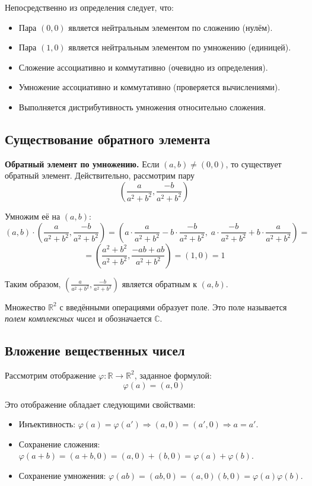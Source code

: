 \documentclass[a4paper,12pt]{article}
\theoremstyle{definition}
\theoremstyle{plain}
\theoremstyle{remark}
\begin{document}
	Непосредственно из определения следует, что:
	\begin{itemize}
		\item Пара $(0, 0)$ является нейтральным элементом по сложению (нулём).
		\item Пара $(1, 0)$ является нейтральным элементом по умножению (единицей).
		\item Сложение ассоциативно и коммутативно (очевидно из определения).
		\item Умножение ассоциативно и коммутативно (проверяется вычислениями).
		\item Выполняется дистрибутивность умножения относительно сложения.
	\end{itemize}
	
	\subsection{Существование обратного элемента}
	
	\noindent \textbf{Обратный элемент по умножению.}
	Если $(a, b) \neq (0, 0)$, то существует обратный элемент. Действительно, рассмотрим пару
	\[
	\left( \frac{a}{a^2 + b^2}, \frac{-b}{a^2 + b^2} \right)
	\]
	
	Умножим её на $(a, b)$:
	\[
	(a, b) \cdot \left( \frac{a}{a^2 + b^2}, \frac{-b}{a^2 + b^2} \right) = 
	\left( a \cdot \frac{a}{a^2 + b^2} - b \cdot \frac{-b}{a^2 + b^2},\; 
	a \cdot \frac{-b}{a^2 + b^2} + b \cdot \frac{a}{a^2 + b^2} \right) =
	\]
	\[
	= \left( \frac{a^2 + b^2}{a^2 + b^2}, \frac{-ab + ab}{a^2 + b^2} \right) = (1, 0) = 1
	\]
	
	Таким образом, $\left( \frac{a}{a^2+b^2}, \frac{-b}{a^2+b^2} \right)$ является обратным к $(a, b)$.
	
	\begin{tcolorbox}[colback=green!5, colframe=green!50!black, title=Вывод]
		Множество $\mathbb{R}^2$ с введёнными операциями образует поле. Это поле называется \textit{полем комплексных чисел} и обозначается $\mathbb{C}$.
	\end{tcolorbox}
	
	\subsection{Вложение вещественных чисел}
	
	\noindent Рассмотрим отображение $\varphi \colon \mathbb{R} \to \mathbb{R}^2$, заданное формулой:
	\[
	\varphi(a) = (a, 0)
	\]
	
	Это отображение обладает следующими свойствами:
	\begin{itemize}
		\item Инъективность: $\varphi(a) = \varphi(a') \Rightarrow (a,0) = (a',0) \Rightarrow a = a'$.
		\item Сохранение сложения: $\varphi(a + b) = (a+b, 0) = (a,0) + (b,0) = \varphi(a) + \varphi(b)$.
		\item Сохранение умножения: $\varphi(ab) = (ab, 0) = (a,0)(b,0) = \varphi(a)\varphi(b)$.
	\end{itemize}
	
\end{document}
